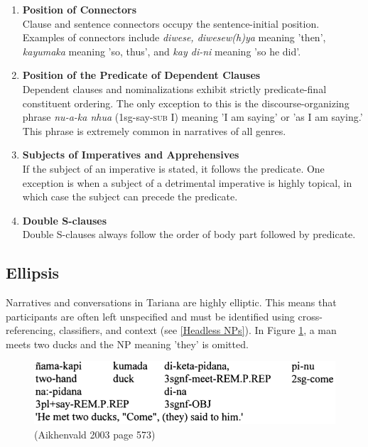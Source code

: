 \documentclass{article}
\begin{document}
\begin{enumerate}
  \item \textbf{Position of Connectors} \\
  Clause and sentence connectors occupy the sentence-initial position. Examples of connectors include \textit{diwese, diwesew(h)ya} meaning 'then', \textit{kayumaka} meaning 'so, thus', and \textit{kay di-ni} meaning 'so he did'.

  \item \textbf{Position of the Predicate of Dependent Clauses} \\
  Dependent clauses and nominalizations exhibit strictly predicate-final constituent ordering. The only exception to this is the discourse-organizing phrase \textit{nu-a-ka nhua} (1sg-say-\textsc{sub} I) meaning 'I am saying' or 'as I am saying.' This phrase is extremely common in narratives of all genres.

  \item \textbf{Subjects of Imperatives and Apprehensives} \\
  If the subject of an imperative is stated, it follows the predicate. One exception is when a subject of a detrimental imperative is highly topical, in which case the subject can precede the predicate.

  \item \textbf{Double S-clauses} \\
  Double S-clauses always follow the order of body part followed by predicate.
\end{enumerate}


\subsection{Ellipsis} \label{Ellipsis}
Narratives and conversations in Tariana are highly elliptic. This means that participants are often left unspecified and must be identified using cross-referencing, classifiers, and context (see \ref*{Headless NPs}). In Figure \ref*{twoducks}, a man meets two ducks and the NP meaning 'they' is omitted.

\begin{figure}[h!]
  \centering
  \includegraphics[scale = 0.39]{twoducks.png}
    \caption{(Aikhenvald 2003 page 573)}
    \label{twoducks}
\end{figure}
\end{document}
